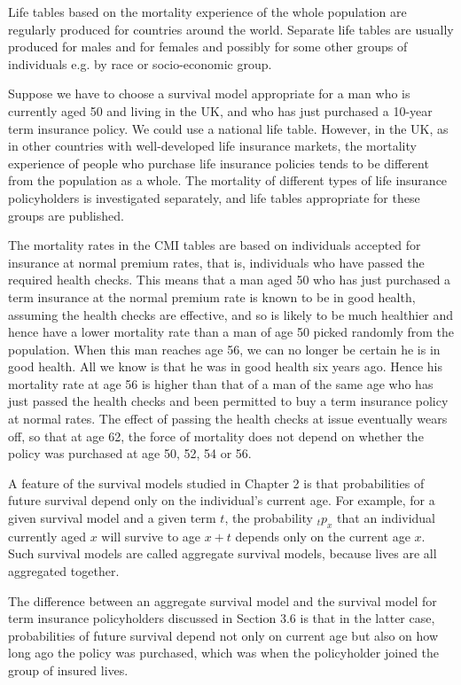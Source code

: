 \documentclass[hidelinks, 12pt]{article}
\theoremstyle{mydefstyle}
\theoremstyle{mythmstyle}
\newcounter{prop}
\begin{document}
Life tables based on the mortality experience of the whole population are regularly produced for countries around the world. Separate life tables are usually produced for males and for females and possibly for some other groups of individuals e.g. by race or socio-economic group.

Suppose we have to choose a survival model appropriate for a man who is currently aged 50 and living in the UK, and who has just purchased a 10-year term insurance policy. We could use a national life table. However, in the UK, as in other countries with well-developed life insurance markets, the mortality experience of people who purchase life insurance policies tends to be different from the population as a whole. The mortality of different types of life insurance policyholders is investigated separately, and life tables appropriate for these groups are published. 

The mortality rates in the CMI tables are based on individuals accepted for insurance at normal premium rates, that is, individuals who have passed the required health checks. This means that a man aged 50 who has just purchased a term insurance at the normal premium rate is known to be in good health, assuming the health checks are effective, and so is likely to be much healthier and hence have a lower mortality rate than a man of age 50 picked randomly from the population. When this man reaches age 56, we can no longer be certain he is in good health. All we know is that he was in good health six years ago. Hence his mortality rate at age 56 is higher than that of a man of the same age who has just passed the health checks and been permitted to buy a term insurance policy at normal rates. The effect of passing the health checks at issue eventually wears off, so that at age 62, the force of mortality does not depend on whether the policy was purchased at age 50, 52, 54 or 56. 

A feature of the survival models studied in Chapter 2 is that probabilities of future survival depend only on the individual's current age. For example, for a given survival model and a given term $t$, the probability $_tp_x$ that an individual currently aged $x$ will survive to age $x+t$ depends only on the current age $x$. Such survival models are called aggregate survival models, because lives are all aggregated together. 

The difference between an aggregate survival model and the survival model for term insurance policyholders discussed in Section 3.6 is that in the latter case, probabilities of future survival depend not only on current age but also on how long ago the policy was purchased, which was when the policyholder joined the group of insured lives. 
\end{document}
